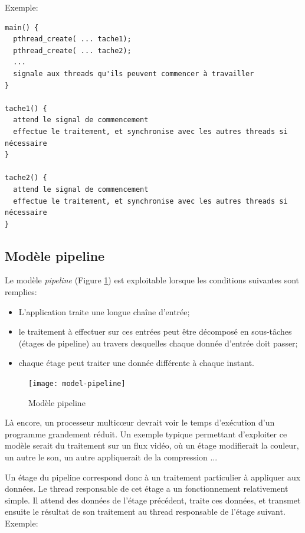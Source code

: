 Exemple:
\begin{mdframed}
\begin{lstlisting}
main() {
  pthread_create( ... tache1);
  pthread_create( ... tache2);
  ...
  signale aux threads qu'ils peuvent commencer à travailler
}

tache1() {
  attend le signal de commencement
  effectue le traitement, et synchronise avec les autres threads si nécessaire
}

tache2() {
  attend le signal de commencement
  effectue le traitement, et synchronise avec les autres threads si nécessaire
}
\end{lstlisting}
\end{mdframed}
\subsection{Modèle pipeline}

Le modèle \emph{pipeline} (Figure \ref{fig:model-pipeline}) est exploitable lorsque les conditions suivantes sont remplies:

\begin{itemize}
  \item L'application traite une longue chaîne d'entrée;
  \item le traitement à effectuer sur ces entrées peut être décomposé en sous-tâches (étages de pipeline) au travers desquelles chaque donnée d'entrée doit passer;
  \item chaque étage peut traiter une donnée différente à chaque instant.
\end{itemize}

\begin{figure}[ht]
  \centering
  \texttt{[image: model-pipeline]}
  \caption{\label{fig:model-pipeline}Modèle pipeline}
\end{figure}


Là encore, un processeur multicœur devrait voir le temps d'exécution d'un programme grandement réduit. Un exemple typique permettant d'exploiter ce modèle serait du traitement sur un flux vidéo, où un étage modifierait la couleur, un autre le son, un autre appliquerait de la compression ...

Un étage du pipeline correspond donc à un traitement particulier à appliquer aux données. Le thread responsable de cet étage a un fonctionnement relativement simple. Il attend des données de l'étage précédent, traite ces données, et transmet ensuite le résultat de son traitement au thread responsable de l'étage suivant.
\newpage
Exemple:

